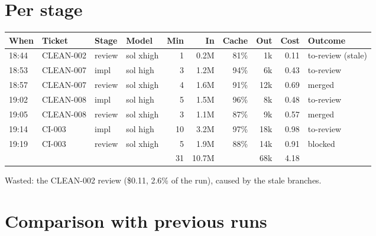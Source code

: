 \documentclass[11pt,a4paper]{article}
\begin{document}
\section*{Per stage}

{\small
\begin{tabularx}{\linewidth}{@{}llllrrrrrX@{}}
\toprule
When & Ticket & Stage & Model & Min & In & Cache & Out & Cost & Outcome \\
\midrule
18:44 & CLEAN-002 & review & sol xhigh & 1 & 0.2M & 81\% & 1k & 0.11 & to-review (stale) \\
18:53 & CLEAN-007 & impl & sol high & 3 & 1.2M & 94\% & 6k & 0.43 & to-review \\
18:57 & CLEAN-007 & review & sol xhigh & 4 & 1.6M & 91\% & 12k & 0.69 & merged \\
19:02 & CLEAN-008 & impl & sol high & 5 & 1.5M & 96\% & 8k & 0.48 & to-review \\
19:05 & CLEAN-008 & review & sol xhigh & 3 & 1.1M & 87\% & 9k & 0.57 & merged \\
19:14 & CI-003 & impl & sol high & 10 & 3.2M & 97\% & 18k & 0.98 & to-review \\
19:19 & CI-003 & review & sol xhigh & 5 & 1.9M & 88\% & 14k & 0.91 & blocked \\
\midrule
 & & & & 31 & 10.7M & & 68k & 4.18 & \\
\bottomrule
\end{tabularx}
}

\begin{center}
\end{center}

Wasted: the CLEAN-002 review (\$0.11, 2.6\% of the run), caused by the stale branches.

\section*{Comparison with previous runs}
\end{document}
